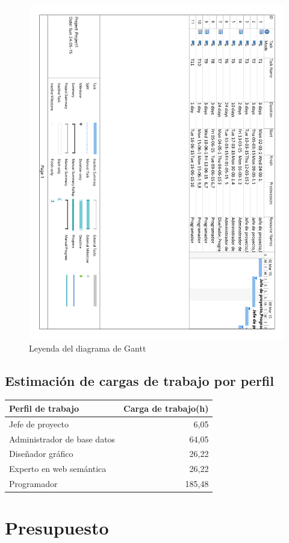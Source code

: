 \begin{figure}[!htp]
	\centering
	\includegraphics[page=4, scale=.7]{fig/real_gantt_diagram}
	\caption{Leyenda del diagrama de Gantt}
\end{figure}

\FloatBarrier

\section{Estimación de cargas de trabajo por perfil}

\begin{center}
	\begin{tabular}{|l|r|}
		\hline
		Perfil de trabajo & Carga de trabajo(h) \\ \hline
		Jefe de proyecto & 6,05 \\ \hline
		Administrador de base datos & 64,05 \\ \hline
		Diseñador gráfico & 26,22 \\ \hline
		Experto en web semántica & 26,22 \\ \hline
		Programador & 185,48 \\
		\hline
	\end{tabular}
\end{center}

\chapter{Presupuesto}





\clearpage

